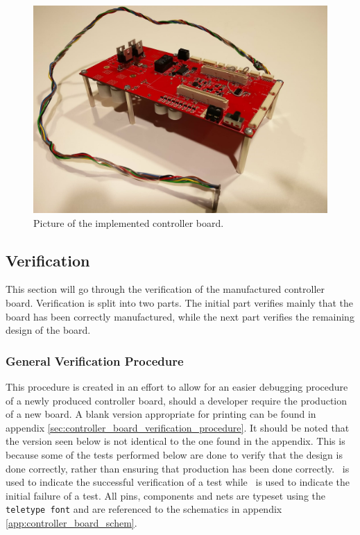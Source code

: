 \begin{figure}[h]
	\centering
	\includegraphics[width=.75\linewidth]{graphics/controllerboard_real}
	\caption{Picture of the implemented controller board.}
	\label{fig:controller_board_img}
\end{figure}
\subsection{Verification} %
\label{ssub:verifaction_controller_board}
This section will go through the verification of the manufactured controller board.
Verification is split into two parts.
The initial part verifies mainly that the board has been correctly manufactured, while the next part verifies the remaining design of the board. 

\subsubsection{General Verification Procedure} %
\label{ssub:verification_procedure}
This procedure is created in an effort to allow for an easier debugging procedure of a newly produced controller board, should a developer require the production of a new board.
A blank version appropriate for printing can be found in appendix \ref{sec:controller_board_verification_procedure}.
It should be noted that the version seen below is not identical to the one found in the appendix.
This is because some of the tests performed below are done to verify that the design is done correctly, rather than ensuring that production has been done correctly.
\cmark ~is used to indicate the successful verification of a test while \xmark ~is used to indicate the initial failure of a test.
All pins, components and nets are typeset using the \texttt{teletype font} and are referenced to the schematics in appendix \ref{app:controller_board_schem}.
